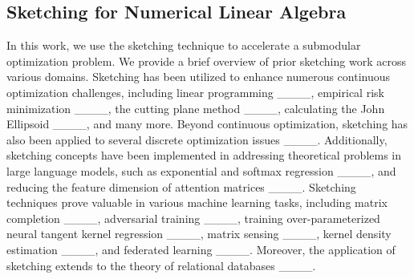 \subsection{Sketching for Numerical Linear Algebra}
In this work, we use the sketching technique to accelerate a submodular optimization problem. We provide a brief overview of prior sketching work across various domains. Sketching has been utilized to enhance numerous continuous optimization challenges, including linear programming ____, empirical risk minimization ____, the cutting plane method ____, calculating the John Ellipsoid ____, and many more.
Beyond continuous optimization, sketching has also been applied to several discrete optimization issues ____. Additionally, sketching concepts have been implemented in addressing theoretical problems in large language models, such as exponential and softmax regression ____, and reducing the feature dimension of attention matrices ____. Sketching techniques prove valuable in various machine learning tasks, including matrix completion ____, adversarial training ____, training over-parameterized neural tangent kernel regression ____, matrix sensing ____, kernel density estimation ____, and federated learning ____. Moreover, the application of sketching extends to the theory of relational databases ____.